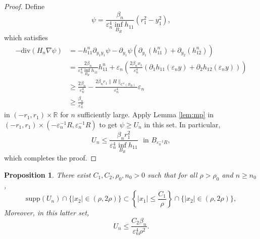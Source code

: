 \documentclass[10pt,a4paper]{article}
\newcommand{\RR}{\mathbb{R}}
\newcommand{\divg}{\mathrm{div}}
\newcommand{\supp}{\mathrm{supp}}
\newcommand{\faskip}{\hspace{8pt}}
\newtheorem{prop}[thm]{Proposition}
\numberwithin{equation}{section}
\begin{document}
\begin{proof}
Define 
\[\psi = \frac{\beta_n}{\varepsilon_n^{4}\inf_{B_R} h_{11}} \left( r_1^{2} - y_1^{2} \right),\]
which satisfies
\begin{align*}
	-\divg(H_n \nabla\psi) &= -h_{11}^{n} \partial_{y_1y_1}\psi - \partial_{y_1}\psi(\partial_{y_1}(h_{11}^{n}) + \partial_{y_2} (h_{12}^{n})) \\
			       &= \frac{2 \beta_n}{\varepsilon_n^{4}\inf_{B_R} h_{11}}h_{11}^{n} +\varepsilon_n \left(\frac{2\beta_nx_1}{\varepsilon_n^{4}}(\partial_1h_{11}(\varepsilon_n y) + \partial_2 h_{12}(\varepsilon_n y))\right) \\
			       &\geq \frac{2 \beta_n}{\varepsilon_n^{4}}  - \frac{2\beta_n r_1 \|H\|_{C^{1}(B_R)}}{\varepsilon_n^{4}} \varepsilon_{n} \\
			       &\geq \frac{\beta_n}{\varepsilon_n^{4}}
\end{align*}
in $ (-r_1, r_1)\times \RR$ for $ n $ sufficiently large. Apply Lemma \ref{lem:mp} in $ (-r_1, r_1)\times (-\varepsilon_n^{-1}R, \varepsilon_n^{-1}R) $ to get $ \psi \geq U_n $ in this set. In particular, 
\[U_n \leq \frac{\beta_n r_1^{2}}{\varepsilon_n^{4}\inf_{B_R} h_{11}} \faskip \text{in }B_{\varepsilon_n^{-1}R},\]
which completes the proof.
\end{proof}

\begin{prop}
	There exist $ C_1,C_2, \rho_0, n_0 > 0$ such that for all $ \rho > \rho_0 $ and $ n\geq n_0 $,
	\[\supp(U_n) \cap \{|x_2| \in (\rho, 2\rho)\}\subset \left\{|x_1| \leq \frac{C_1}{\rho}\right\} \cap \{|x_2| \in (\rho, 2\rho)\}, \]	
	Moreover, in this latter set, 
	\[ U_n \leq \frac{C_2\beta_n}{\varepsilon_n^4\rho^2}. \]
\end{prop}
\end{document}
